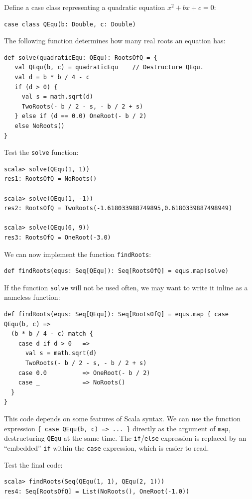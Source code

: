 Define a case class representing a quadratic equation $x^{2}+bx+c=0$:
\begin{lstlisting}
case class QEqu(b: Double, c: Double)
\end{lstlisting}
The following function determines how many real roots an equation
has:
\begin{lstlisting}
def solve(quadraticEqu: QEqu): RootsOfQ = {
   val QEqu(b, c) = quadraticEqu    // Destructure QEqu.
   val d = b * b / 4 - c
   if (d > 0) {
     val s = math.sqrt(d)
     TwoRoots(- b / 2 - s, - b / 2 + s)
   } else if (d == 0.0) OneRoot(- b / 2)
   else NoRoots()
}
\end{lstlisting}
Test the \lstinline!solve! function:
\begin{lstlisting}
scala> solve(QEqu(1, 1))
res1: RootsOfQ = NoRoots()

scala> solve(QEqu(1, -1))
res2: RootsOfQ = TwoRoots(-1.618033988749895,0.6180339887498949) 

scala> solve(QEqu(6, 9))
res3: RootsOfQ = OneRoot(-3.0) 
\end{lstlisting}
We can now implement the function \lstinline!findRoots!:
\begin{lstlisting}
def findRoots(equs: Seq[QEqu]): Seq[RootsOfQ] = equs.map(solve)
\end{lstlisting}
If the function \lstinline!solve! will not be used often, we may
want to write it inline as a nameless function:
\begin{lstlisting}
def findRoots(equs: Seq[QEqu]): Seq[RootsOfQ] = equs.map { case QEqu(b, c) =>
  (b * b / 4 - c) match {
    case d if d > 0   =>
      val s = math.sqrt(d)
      TwoRoots(- b / 2 - s, - b / 2 + s)
    case 0.0          => OneRoot(- b / 2)
    case _            => NoRoots()
  }
}
\end{lstlisting}
This code depends on some features of Scala syntax. We can use the
function expression \lstinline!{ case QEqu(b, c) => ... }! directly
as the argument of \lstinline!map!, destructuring \lstinline!QEqu!
at the same time. The \lstinline!if!/\lstinline!else! expression
is replaced by an \textsf{``}embedded\textsf{''}
\lstinline!if! within the \lstinline!case! expression, which is
easier to read.

Test the final code:
\begin{lstlisting}
scala> findRoots(Seq(QEqu(1, 1), QEqu(2, 1)))
res4: Seq[RootsOfQ] = List(NoRoots(), OneRoot(-1.0)) 
\end{lstlisting}


